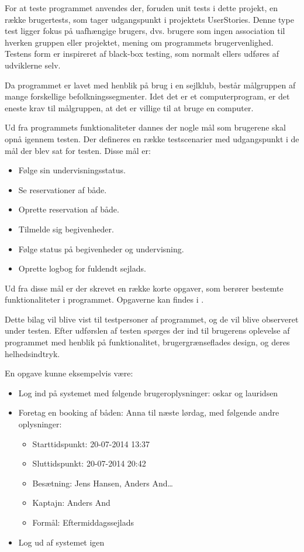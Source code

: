 For at teste programmet anvendes der, foruden unit tests i dette projekt, en række brugertests, som tager udgangspunkt i projektets UserStories. 
Denne type test ligger fokus på uafhængige brugers, dvs. brugere som ingen association til hverken gruppen eller projektet, mening om programmets brugervenlighed.
Testens form er inspireret af black-box testing, som normalt ellers udføres af udviklerne selv.

Da programmet er lavet med henblik på brug i en sejlklub, består målgruppen af mange forskellige befolkningssegmenter. 
Idet det er et computerprogram, er det eneste krav til målgruppen, at det er villige til at bruge en computer.

Ud fra programmets funktionaliteter dannes der nogle mål som brugerene skal opnå igennem testen. 
Der defineres en række testscenarier med udgangspunkt i de mål der blev sat for testen.
Disse mål er:
\begin{itemize}
  \item Følge sin undervisningsstatus.
  \item Se reservationer af både.
  \item Oprette reservation af både.
  \item Tilmelde sig begivenheder.
  \item Følge status på begivenheder og undervisning.
  \item Oprette logbog for fuldendt sejlads.
\end{itemize}

Ud fra disse mål er der skrevet en række korte opgaver, som berører bestemte funktionaliteter i programmet. 
Opgaverne kan findes i .

Dette bilag vil blive vist til testpersoner af programmet, og de vil blive observeret under testen. 
Efter udførslen af testen spørges der ind til brugerens oplevelse af programmet med henblik på funktionalitet, brugergrænseflades design, og deres helhedsindtryk.

En opgave kunne eksempelvis være:
\begin{itemize}
	\item Log ind på systemet med følgende brugeroplysninger: oskar og lauridsen
	\item Foretag en booking af båden: Anna til næste lørdag, med følgende andre oplysninger: 
	\begin{itemize}
		\item Starttidspunkt: 20-07-2014 13:37
		\item Sluttidspunkt: 20-07-2014 20:42
		\item Besætning: Jens Hansen, Anders And\ldots
		\item Kaptajn: Anders And
		\item Formål: Eftermiddagssejlads
	\end{itemize}
	\item Log ud af systemet igen
\end{itemize}

